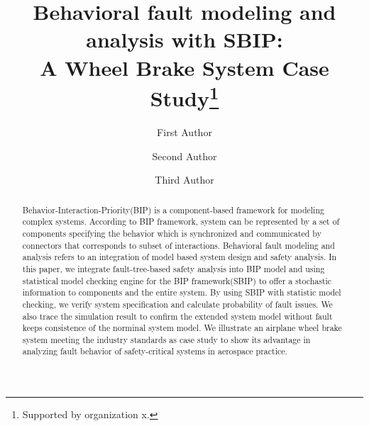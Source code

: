 \documentclass[runningheads]{llncs}
\begin{document}
%
\title{Behavioral fault modeling and analysis with SBIP: \\ A Wheel Brake System Case Study\thanks{Supported by organization x.}}
%
%
\author{First Author \and
Second Author \and
Third Author}
%
%
%
\maketitle              %
%
\begin{abstract}
Behavior-Interaction-Priority(BIP) is a component-based framework for modeling complex systems. According to BIP framework, system can be represented by a set of components specifying the behavior which is synchronized and communicated by connectors that corresponds to subset of interactions.
Behavioral fault modeling and analysis refers to an integration of model based system design and safety analysis. In this paper, we integrate fault-tree-based safety analysis into BIP model and using statistical model checking engine for the BIP framework(SBIP) to offer a stochastic information to components and the entire system. By using SBIP with statistic model checking, we verify system specification and calculate probability of fault issues. We also trace the simulation result to confirm the extended system model without fault keeps consistence of the norminal system model.  
We illustrate an airplane wheel brake system meeting the industry standards as case study to show its advantage in analyzing fault behavior of safety-critical systems in aerospace practice.

\end{abstract}
%
%
%

\end{document}
